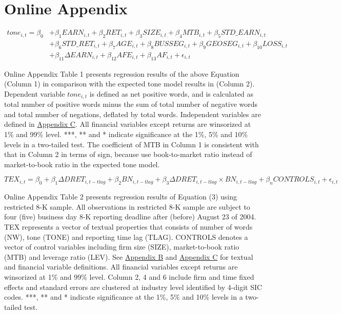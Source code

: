 \section*{Online Appendix}


\begin{equation*}
\begin{split}
tone_{i,t}=\beta_0&+\beta_1EARN_{i,t}+\beta_2RET_{i,t}+\beta_3SIZE_{i,t}+\beta_4MTB_{i,t}+\beta_5STD\_EARN_{i,t}\\
&+\beta_6STD\_RET_{i,t}+\beta_7AGE_{i,t}+\beta_8BUSSEG_{i,t}+\beta_9GEOSEG_{i,t}+\beta_{10}LOSS_{i,t}\\
&+\beta_{11}\Delta EARN_{i,t}+\beta_{12}AFE_{i,t}+\beta_{13}AF_{i,t}+\epsilon_{i,t}
\end{split}
\end{equation*}

Online Appendix Table 1 presents regression results of the above Equation (Column 1) in comparison with the expected tone model results in  (Column 2). Dependent variable $tone_{i,t}$ is defined as net positive words, and is calculated as total number of positive words minus the sum of total number of negative words and total number of negations, deflated by total words. Independent variables are defined in \hyperref[appc]{Appendix C}. All financial variables except returns are winsorized at 1\% and 99\% level. ***, ** and * indicate significance at the 1\%, 5\% and 10\% levels in a two-tailed test. The coefficient of MTB in Column 1 is consistent with that in Column 2 in terms of sign, because  use book-to-market ratio instead of market-to-book ratio in the expected tone model. 


\newpage

\setcounter{equation}{2}
\begin{equation}
TEX_{i,t}=\beta_0+\beta_1\Delta DRET_{i,t-tlag}+\beta_2BN_{i,t-tlag}+\beta_3\Delta DRET_{i,t-tlag}\times BN_{i,t-tlag}+\beta_nCONTROLS_{i,t}+\epsilon_{i,t}
\end{equation}

Online Appendix Table 2 presents regression results of Equation (3) using restricted 8-K sample. All observations in restricted 8-K sample are subject to four (five) business day 8-K reporting deadline after (before) August 23 of 2004. TEX represents a vector of textual properties that consists of number of words (NW), tone (TONE) and reporting time lag (TLAG). CONTROLS denotes a vector of control variables including firm size (SIZE), market-to-book ratio (MTB) and leverage ratio (LEV). See \hyperref[appb]{Appendix B} and \hyperref[appc]{Appendix C} for textual and financial variable definitions. All financial variables except returns are winsorized at 1\% and 99\% level. Column 2, 4 and 6 include firm and time fixed effects and standard errors are clustered at industry level identified by 4-digit SIC codes. ***, ** and * indicate significance at the 1\%, 5\% and 10\% levels in a two-tailed test.

